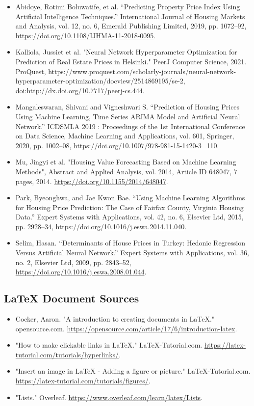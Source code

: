 \documentclass[12pt]{article}
\begin{document}
	\begin{itemize}
		\item Abidoye, Rotimi Boluwatife, et al. “Predicting Property Price Index Using Artificial Intelligence Techniques.” International Journal of Housing Markets and Analysis, vol. 12, no. 6, Emerald Publishing Limited, 2019, pp. 1072–92, \url{https://doi.org/10.1108/IJHMA-11-2018-0095}.
		
		\item Kalliola, Jussiet et al. "Neural Network Hyperparameter Optimization for Prediction of Real Estate Prices in Helsinki." PeerJ Computer Science, 2021. ProQuest, https://www.proquest.com/scholarly-journals/neural-network-hyperparameter-optimization/docview/2514869195/se-2, doi:\url{http://dx.doi.org/10.7717/peerj-cs.444}.
		
		\item Mangaleswaran, Shivani and Vigneshwari S. “Prediction of Housing Prices Using Machine Learning, Time Series ARIMA Model and Artificial Neural Network.” ICDSMLA 2019 : Proceedings of the 1st International Conference on Data Science, Machine Learning and Applications, vol. 601, Springer, 2020, pp. 1002–08, \url{https://doi.org/10.1007/978-981-15-1420-3_110}.	
			
		\item Mu, Jingyi et al. "Housing Value Forecasting Based on Machine Learning Methods", Abstract and Applied Analysis, vol. 2014, Article ID 648047, 7 pages, 2014. \url{https://doi.org/10.1155/2014/648047}.
		
		\item Park, Byeonghwa, and Jae Kwon Bae. “Using Machine Learning Algorithms for Housing Price Prediction: The Case of Fairfax County, Virginia Housing Data.” Expert Systems with Applications, vol. 42, no. 6, Elsevier Ltd, 2015, pp. 2928–34, \url{https://doi.org/10.1016/j.eswa.2014.11.040}.
		
		\item Selim, Hasan. “Determinants of House Prices in Turkey: Hedonic Regression Versus Artificial Neural Network.” Expert Systems with Applications, vol. 36, no. 2, Elsevier Ltd, 2009, pp. 2843–52, \url{https://doi.org/10.1016/j.eswa.2008.01.044}.
	\end{itemize}

	\subsection{LaTeX Document Sources}

	\begin{itemize}
		\item Cocker, Aaron. "A introduction to creating documents in LaTeX." opensource.com. \url{https://opensource.com/article/17/6/introduction-latex}.
		\item "How to make clickable links in LaTeX." LaTeX-Tutorial.com. \url{https://latex-tutorial.com/tutorials/hyperlinks/}.
		\item "Insert an image in LaTeX - Adding a figure or picture." LaTeX-Tutorial.com. \url{https://latex-tutorial.com/tutorials/figures/}.
		\item "Lists." Overleaf. \url{https://www.overleaf.com/learn/latex/Lists}.
		
	\end{itemize}
		
\end{document}
